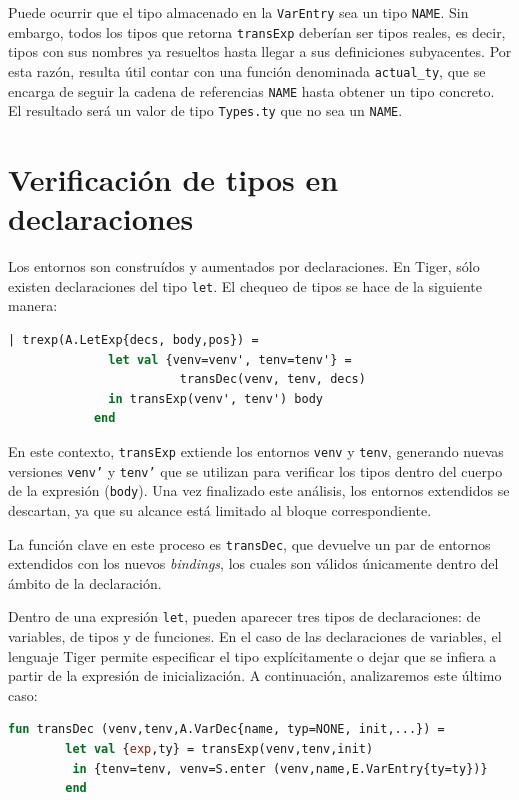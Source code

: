 \documentclass[runningheads]{llncs}
\begin{document}
Puede ocurrir que el tipo almacenado en la \texttt{VarEntry} sea un tipo \texttt{NAME}. Sin embargo, todos los tipos que retorna \texttt{transExp} deberían ser tipos reales, es decir, tipos con sus nombres ya resueltos hasta llegar a sus definiciones subyacentes. Por esta razón, resulta útil contar con una función denominada \texttt{actual\_ty}, que se encarga de seguir la cadena de referencias \texttt{NAME} hasta obtener un tipo concreto. El resultado será un valor de tipo \texttt{Types.ty} que no sea un \texttt{NAME}.

\section{Verificación de tipos en declaraciones}
Los entornos son construídos y aumentados por declaraciones. En Tiger, sólo existen declaraciones del tipo \texttt{let}. El chequeo de tipos se hace de la siguiente manera: 

\begin{lstlisting}[language=ML, caption={Caso LetExp en la función trexp que actualiza entornos y evalúa el cuerpo}, captionpos=b]
          | trexp(A.LetExp{decs, body,pos}) =
              let val {venv=venv', tenv=tenv'} =
                        transDec(venv, tenv, decs)
              in transExp(venv', tenv') body
            end
\end{lstlisting}

En este contexto, \texttt{transExp} extiende los entornos \texttt{venv} y \texttt{tenv}, generando nuevas versiones \texttt{venv'} y \texttt{tenv'} que se utilizan para verificar los tipos dentro del cuerpo de la expresión (\texttt{body}). Una vez finalizado este análisis, los entornos extendidos se descartan, ya que su alcance está limitado al bloque correspondiente.

La función clave en este proceso es \texttt{transDec}, que devuelve un par de entornos extendidos con los nuevos \textit{bindings}, los cuales son válidos únicamente dentro del ámbito de la declaración.

Dentro de una expresión \texttt{let}, pueden aparecer tres tipos de declaraciones: de variables, de tipos y de funciones. En el caso de las declaraciones de variables, el lenguaje Tiger permite especificar el tipo explícitamente o dejar que se infiera a partir de la expresión de inicialización. A continuación, analizaremos este último caso:

\begin{lstlisting}[language=ML, caption={Caso \texttt{VarDec} sin tipo explícito en la función \texttt{transDec}}, captionpos=b]
    fun transDec (venv,tenv,A.VarDec{name, typ=NONE, init,...}) =
        let val {exp,ty} = transExp(venv,tenv,init)
         in {tenv=tenv, venv=S.enter (venv,name,E.VarEntry{ty=ty})}
        end
\end{lstlisting}
\end{document}

